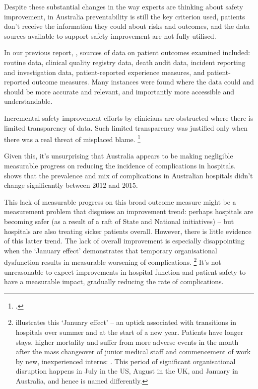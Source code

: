 \documentclass[FrontPage]{grattan}
\begin{document}
Despite these substantial changes in the way experts are thinking about safety improvement, in Australia preventability is still the key criterion used, patients don't receive the information they could about risks and outcomes, and the data sources available to support safety improvement are not fully utilised.

In our previous report, , sources of data on patient outcomes examined included: routine data, clinical quality registry data, death audit data, incident reporting and investigation data, patient-reported experience measures, and patient-reported outcome measures. Many instances were found where the data could and should be more accurate and relevant, and importantly more accessible and understandable. 

Incremental safety improvement efforts by clinicians are obstructed where there is limited transparency of data. Such limited transparency was justified only when there was a real threat of misplaced blame.%
	\footcite{DuckettEtAl-2017-Strengthening-safety-statistics}

Given this, it's unsurprising that Australia appears to be making negligible measurable progress on reducing the incidence of complications in hospitals.
shows that the prevalence and mix of complications in Australian hospitals didn't change significantly between 2012 and 2015.

This lack of measurable progress on this broad outcome measure might be a measurement problem that disguises an improvement trend: perhaps hospitals are becoming safer (as a result of a raft of State and National initiatives) -- but hospitals are also treating sicker patients overall.
However, there is little evidence of this latter trend.
The lack of overall improvement is especially disappointing when the `January effect' demonstrates that temporary organisational dysfunction results in measurable worsening of complications.%
	\footnote{ illustrates this `January effect' -- an uptick associated with transitions in hospitals over summer and at the start of a new year.
	Patients have longer stays, higher mortality and suffer from more adverse events in the month after
	 the mass changeover of junior medical staff and commencement of work by new, inexperienced interns:
	 \textcites{young2011july}{jen2009early}{wen2015july}.
	This period of significant organisational disruption happens in July in the US, August in the UK, and January in Australia, and hence is named differently.}
It's not unreasonable to expect improvements in hospital function and patient safety to have a measurable impact, gradually reducing the rate of complications.
\end{document}
